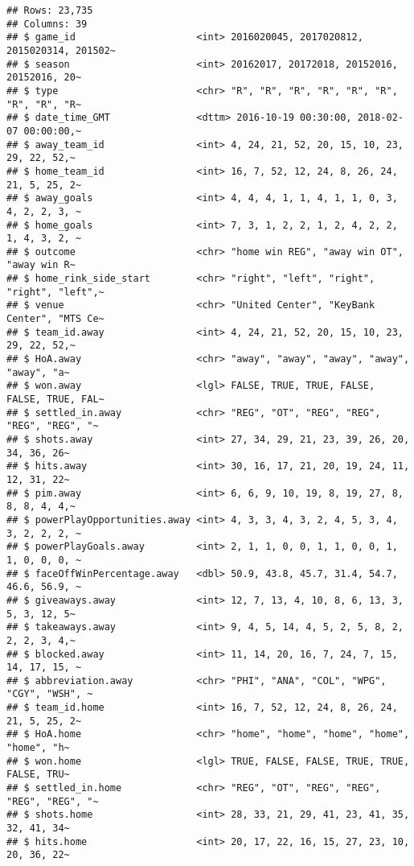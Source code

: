 \documentclass[
]{article}
\begin{document}
\begin{verbatim}
## Rows: 23,735
## Columns: 39
## $ game_id                     <int> 2016020045, 2017020812, 2015020314, 201502~
## $ season                      <int> 20162017, 20172018, 20152016, 20152016, 20~
## $ type                        <chr> "R", "R", "R", "R", "R", "R", "R", "R", "R~
## $ date_time_GMT               <dttm> 2016-10-19 00:30:00, 2018-02-07 00:00:00,~
## $ away_team_id                <int> 4, 24, 21, 52, 20, 15, 10, 23, 29, 22, 52,~
## $ home_team_id                <int> 16, 7, 52, 12, 24, 8, 26, 24, 21, 5, 25, 2~
## $ away_goals                  <int> 4, 4, 4, 1, 1, 4, 1, 1, 0, 3, 4, 2, 2, 3, ~
## $ home_goals                  <int> 7, 3, 1, 2, 2, 1, 2, 4, 2, 2, 1, 4, 3, 2, ~
## $ outcome                     <chr> "home win REG", "away win OT", "away win R~
## $ home_rink_side_start        <chr> "right", "left", "right", "right", "left",~
## $ venue                       <chr> "United Center", "KeyBank Center", "MTS Ce~
## $ team_id.away                <int> 4, 24, 21, 52, 20, 15, 10, 23, 29, 22, 52,~
## $ HoA.away                    <chr> "away", "away", "away", "away", "away", "a~
## $ won.away                    <lgl> FALSE, TRUE, TRUE, FALSE, FALSE, TRUE, FAL~
## $ settled_in.away             <chr> "REG", "OT", "REG", "REG", "REG", "REG", "~
## $ shots.away                  <int> 27, 34, 29, 21, 23, 39, 26, 20, 34, 36, 26~
## $ hits.away                   <int> 30, 16, 17, 21, 20, 19, 24, 11, 12, 31, 22~
## $ pim.away                    <int> 6, 6, 9, 10, 19, 8, 19, 27, 8, 8, 8, 4, 4,~
## $ powerPlayOpportunities.away <int> 4, 3, 3, 4, 3, 2, 4, 5, 3, 4, 3, 2, 2, 2, ~
## $ powerPlayGoals.away         <int> 2, 1, 1, 0, 0, 1, 1, 0, 0, 1, 1, 0, 0, 0, ~
## $ faceOffWinPercentage.away   <dbl> 50.9, 43.8, 45.7, 31.4, 54.7, 46.6, 56.9, ~
## $ giveaways.away              <int> 12, 7, 13, 4, 10, 8, 6, 13, 3, 5, 3, 12, 5~
## $ takeaways.away              <int> 9, 4, 5, 14, 4, 5, 2, 5, 8, 2, 2, 2, 3, 4,~
## $ blocked.away                <int> 11, 14, 20, 16, 7, 24, 7, 15, 14, 17, 15, ~
## $ abbreviation.away           <chr> "PHI", "ANA", "COL", "WPG", "CGY", "WSH", ~
## $ team_id.home                <int> 16, 7, 52, 12, 24, 8, 26, 24, 21, 5, 25, 2~
## $ HoA.home                    <chr> "home", "home", "home", "home", "home", "h~
## $ won.home                    <lgl> TRUE, FALSE, FALSE, TRUE, TRUE, FALSE, TRU~
## $ settled_in.home             <chr> "REG", "OT", "REG", "REG", "REG", "REG", "~
## $ shots.home                  <int> 28, 33, 21, 29, 41, 23, 41, 35, 32, 41, 34~
## $ hits.home                   <int> 20, 17, 22, 16, 15, 27, 23, 10, 20, 36, 22~

\end{verbatim}
\end{document}
